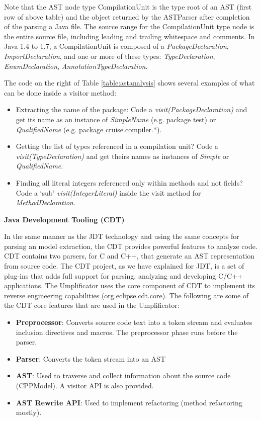 Note that the AST node type CompilationUnit is the type root of an AST (first row of above table) and the object returned by the ASTParser after completion of the parsing a Java file. The source range for the CompilationUnit type node is the entire source file, including leading and trailing whitespace and comments. In Java 1.4 to 1.7, a CompilationUnit is composed of 
a \textit{PackageDeclaration}, \textit{ImportDeclaration}, and one or more of these types:  \textit{TypeDeclaration}, \textit{EnumDeclaration}, \textit{AnnotationTypeDeclaration}. 

The code on the right of Table \ref{table:astanalysis} shows several examples of what can be done inside a visitor method:

\begin{itemize}
\item Extracting the name of the package: Code a \textit{visit(PackageDeclaration)} and get its name as an instance of \textit{SimpleName} (e.g. package test)  or \textit{QualifiedName} (e.g. package cruise.compiler.*).
\item Getting the list of types referenced in a compilation unit? Code a \textit{visit(TypeDeclaration)} and get theirs names as instances of \textit{Simple} or \textit{QualifiedName}.
\item Finding all literal integers referenced only within methods and not fields? Code a `sub' \textit{visit(IntegerLiteral)} inside the visit method for \textit{MethodDeclaration}.
\end{itemize}

\textbf{Java Development Tooling (CDT)}

In the same manner as the JDT technology and using the same concepts for parsing an model extraction, the CDT provides powerful features to analyze code. CDT contains two parsers, for C and C++, that generate an AST representation from source code. The CDT project, as we have explained for JDT, is a set of plug-ins that adds full support for parsing, analyzing and developing C/C++ applications. The Umplificator uses the core component of CDT to implement its reverse engineering capabilities (org.eclipse.cdt.core). The following are some of the CDT core features that are used in the Umplificator:


\begin{itemize}
\item \textbf{Preprocessor}: Converts source code text into a token stream and evaluates inclusion directives and macros. The preprocessor phase runs before the parser. 
\item \textbf{Parser}: Converts the token stream into an AST
\item \textbf{AST}: Used to traverse and collect information about the source code (CPPModel). A visitor API is also provided. 
\item \textbf{AST Rewrite API}: Used to implement refactoring (method refactoring mostly).
\end{itemize}

